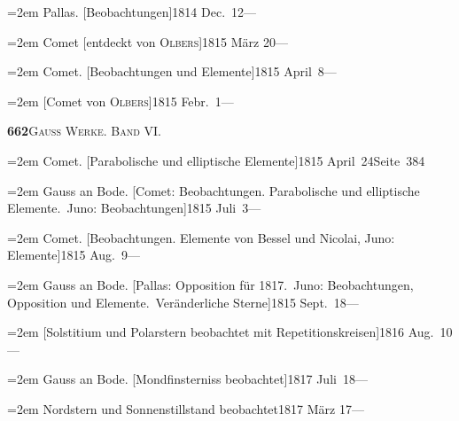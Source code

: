 \documentclass[12pt,a4paper]{article}
\begin{document}
{{{{{{{\vspace{0.5mm}
\noindent\hangindent=2em
Pallas. [Beobachtungen]\hfill 1814 Dec.\ 12\quad ---

\vspace{0.5mm}
\noindent\hangindent=2em
Comet [entdeckt von \textsc{Olbers}]\hfill 1815 M\"arz 20\quad ---

\vspace{0.5mm}
\noindent\hangindent=2em
Comet. [Beobachtungen und Elemente]\hfill 1815 April\ 8\quad ---

\vspace{0.5mm}
\noindent\hangindent=2em
[Comet von \textsc{Olbers}]\hfill 1815 Febr.\ 1\quad ---

\newpage

\begin{center}\small\textbf{662}\quad\textsc{Gauss Werke. Band VI.}\end{center}

\vspace{0.3cm}

{\small
\noindent\hangindent=2em
Comet. [Parabolische und elliptische Elemente]\hfill 1815 April\ 24\quad Seite\ 384

\vspace{0.5mm}
\noindent\hangindent=2em
Gauss an Bode. [Comet: Beobachtungen. Parabolische und elliptische Elemente.\ Juno: Beobachtungen]\hfill 1815 Juli\ 3\quad ---

\vspace{0.5mm}
\noindent\hangindent=2em
Comet. [Beobachtungen. Elemente von Bessel und Nicolai, Juno: Elemente]\hfill 1815 Aug.\ 9\quad ---

\vspace{0.5mm}
\noindent\hangindent=2em
Gauss an Bode. [Pallas: Opposition f\"ur 1817.\ Juno: Beobachtungen, Opposition und Elemente.\ Ver\"anderliche Sterne]\hfill 1815 Sept.\ 18\quad ---

\vspace{0.5mm}
\noindent\hangindent=2em
[Solstitium und Polarstern beobachtet mit Repetitionskreisen]\hfill 1816 Aug.\ 10\quad ---

\vspace{0.5mm}
\noindent\hangindent=2em
Gauss an Bode. [Mondfinsterniss beobachtet]\hfill 1817 Juli\ 18\quad ---

\vspace{0.5mm}
\noindent\hangindent=2em
Nordstern und Sonnenstillstand beobachtet\hfill 1817 M\"arz 17\quad ---

}}}}}}}}
\end{document}
